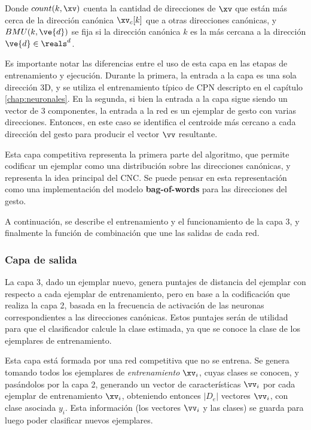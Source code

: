 Donde $count(k,\xv)$ cuenta la cantidad de direcciones de $\xv$ que están más cerca de la dirección canónica $\xv_c[k]$ que a otras direcciones canónicas, y $BMU(k,\ve{d})$ se fija si la dirección canónica $k$ es la más cercana a la dirección $\ve{d} \in \reals^d$.


Es importante notar las diferencias entre el uso de esta capa en las etapas de entrenamiento y ejecución. Durante la primera, la entrada a la capa es una sola dirección 3D, y se utiliza el entrenamiento típico de CPN descripto en el capítulo \ref{chap:neuronales}. En la segunda, si bien la entrada a la capa sigue siendo un vector de 3 componentes, la entrada a la red es un ejemplar de gesto con varias direcciones. Entonces, en este caso se identifica el centroide más cercano a cada dirección del gesto para producir el vector $\vv$ resultante.

Esta capa competitiva representa la primera parte del algoritmo, que permite codificar un ejemplar como una distribución sobre las direcciones canónicas, y representa la idea principal del CNC. Se puede pensar en esta representación como una implementación del modelo \textbf{bag-of-words} \cite{zhang2010understanding} para las direcciones del gesto.

A continuación, se describe el entrenamiento y el funcionamiento de la capa 3, y finalmente la función de combinación que une las salidas de cada red.

\subsubsection{Capa de salida}

La capa 3, dado un ejemplar nuevo, genera puntajes de distancia del ejemplar con respecto a cada ejemplar de entrenamiento, pero en base a la codificación que realiza la capa 2, basada en la frecuencia de activación de las neuronas correspondientes a las direcciones canónicas. Estos puntajes serán de utilidad para que el clasificador calcule la clase estimada, ya que se conoce la clase de los ejemplares de entrenamiento. 


Esta capa está formada por una red competitiva que no se entrena. Se genera tomando todos los ejemplares de \textit{entrenamiento} $\xv_i$, cuyas clases se conocen, y pasándolos por la capa 2, generando un vector de características $\vv_i$ por cada ejemplar de entrenamiento $\xv_i$, obteniendo entonces $|D_e|$ vectores $\vv_i$, con clase asociada $y_i$. Esta información (los vectores $\vv_i$ y las clases) se guarda para luego poder clasificar nuevos ejemplares.


